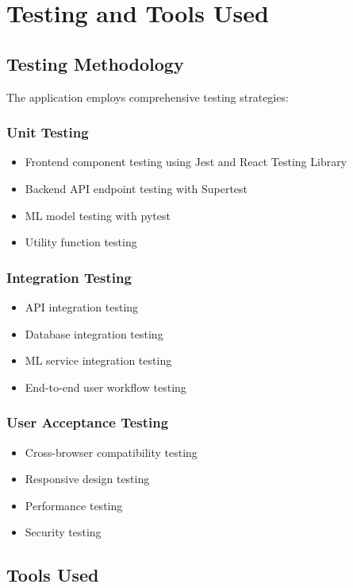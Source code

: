\documentclass[12pt,a4paper]{article}
\begin{document}
\section{Testing and Tools Used}

\subsection{Testing Methodology}

The application employs comprehensive testing strategies:

\subsubsection{Unit Testing}
\begin{itemize}
    \item Frontend component testing using Jest and React Testing Library
    \item Backend API endpoint testing with Supertest
    \item ML model testing with pytest
    \item Utility function testing
\end{itemize}

\subsubsection{Integration Testing}
\begin{itemize}
    \item API integration testing
    \item Database integration testing
    \item ML service integration testing
    \item End-to-end user workflow testing
\end{itemize}

\subsubsection{User Acceptance Testing}
\begin{itemize}
    \item Cross-browser compatibility testing
    \item Responsive design testing
    \item Performance testing
    \item Security testing
\end{itemize}

\subsection{Tools Used}
\end{document}
